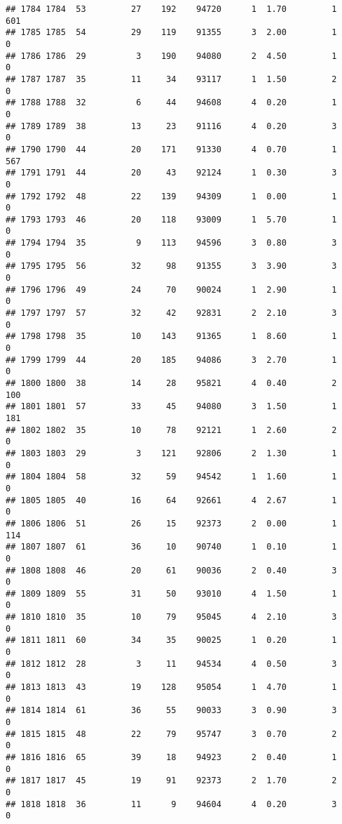 \documentclass[
]{article}
\begin{document}
\begin{verbatim}
## 1784 1784  53         27    192    94720      1  1.70         1      601
## 1785 1785  54         29    119    91355      3  2.00         1        0
## 1786 1786  29          3    190    94080      2  4.50         1        0
## 1787 1787  35         11     34    93117      1  1.50         2        0
## 1788 1788  32          6     44    94608      4  0.20         1        0
## 1789 1789  38         13     23    91116      4  0.20         3        0
## 1790 1790  44         20    171    91330      4  0.70         1      567
## 1791 1791  44         20     43    92124      1  0.30         3        0
## 1792 1792  48         22    139    94309      1  0.00         1        0
## 1793 1793  46         20    118    93009      1  5.70         1        0
## 1794 1794  35          9    113    94596      3  0.80         3        0
## 1795 1795  56         32     98    91355      3  3.90         3        0
## 1796 1796  49         24     70    90024      1  2.90         1        0
## 1797 1797  57         32     42    92831      2  2.10         3        0
## 1798 1798  35         10    143    91365      1  8.60         1        0
## 1799 1799  44         20    185    94086      3  2.70         1        0
## 1800 1800  38         14     28    95821      4  0.40         2      100
## 1801 1801  57         33     45    94080      3  1.50         1      181
## 1802 1802  35         10     78    92121      1  2.60         2        0
## 1803 1803  29          3    121    92806      2  1.30         1        0
## 1804 1804  58         32     59    94542      1  1.60         1        0
## 1805 1805  40         16     64    92661      4  2.67         1        0
## 1806 1806  51         26     15    92373      2  0.00         1      114
## 1807 1807  61         36     10    90740      1  0.10         1        0
## 1808 1808  46         20     61    90036      2  0.40         3        0
## 1809 1809  55         31     50    93010      4  1.50         1        0
## 1810 1810  35         10     79    95045      4  2.10         3        0
## 1811 1811  60         34     35    90025      1  0.20         1        0
## 1812 1812  28          3     11    94534      4  0.50         3        0
## 1813 1813  43         19    128    95054      1  4.70         1        0
## 1814 1814  61         36     55    90033      3  0.90         3        0
## 1815 1815  48         22     79    95747      3  0.70         2        0
## 1816 1816  65         39     18    94923      2  0.40         1        0
## 1817 1817  45         19     91    92373      2  1.70         2        0
## 1818 1818  36         11      9    94604      4  0.20         3        0

\end{verbatim}
\end{document}
